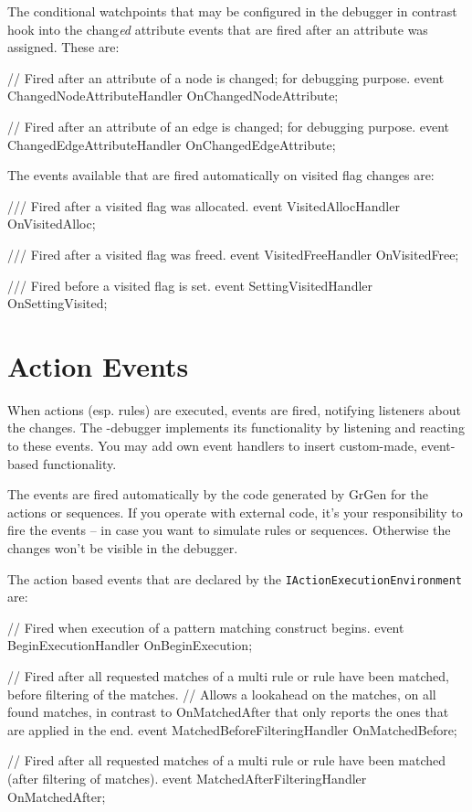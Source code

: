 The conditional watchpoints that may be configured in the debugger in contrast hook into the chang\emph{ed} attribute events that are fired after an attribute was assigned. These are:

\begin{csharplet}
// Fired after an attribute of a node is changed; for debugging purpose.
event ChangedNodeAttributeHandler OnChangedNodeAttribute;

// Fired after an attribute of an edge is changed; for debugging purpose.
event ChangedEdgeAttributeHandler OnChangedEdgeAttribute;
\end{csharplet}

The events available that are fired automatically on visited flag changes are:

\begin{csharplet}
/// Fired after a visited flag was allocated.
event VisitedAllocHandler OnVisitedAlloc;

/// Fired after a visited flag was freed.
event VisitedFreeHandler OnVisitedFree;

/// Fired before a visited flag is set.
event SettingVisitedHandler OnSettingVisited;
\end{csharplet}

\section{Action Events}\label{sec:actionevent}

When actions (esp. rules) are executed, events are fired, notifying listeners about the changes.
The \GrShell-debugger implements its functionality by listening and reacting to these events.
You may add own event handlers to insert custom-made, event-based functionality.

The events are fired automatically by the code generated by GrGen for the actions or sequences.
If you operate with external code, it's your responsibility to fire the events -- in case you want to simulate rules or sequences.
Otherwise the changes won't be visible in the debugger.

The action based events that are declared by the \texttt{IActionExecutionEnvironment} are:

\begin{csharplet}
// Fired when execution of a pattern matching construct begins.
event BeginExecutionHandler OnBeginExecution;

// Fired after all requested matches of a multi rule or rule have been matched, before filtering of the matches.
// Allows a lookahead on the matches, on all found matches, in contrast to OnMatchedAfter that only reports the ones that are applied in the end.
event MatchedBeforeFilteringHandler OnMatchedBefore;

// Fired after all requested matches of a multi rule or rule have been matched (after filtering of matches).
event MatchedAfterFilteringHandler OnMatchedAfter;
\end{csharplet}

